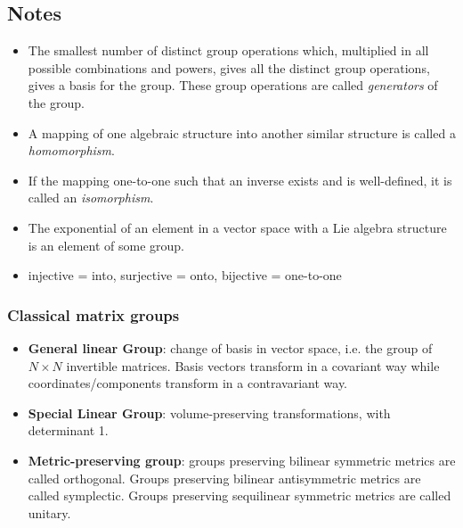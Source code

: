 \subsection{Notes}
\begin{itemize}
    \item The smallest number of distinct group operations which, multiplied in all possible combinations and powers, gives all the distinct group operations, gives a basis for the group. These group operations are called \emph{generators} of the group.
    \item A mapping of one algebraic structure into another similar structure is called a \emph{homomorphism}.
    \item If the mapping one-to-one such that an inverse exists and is well-defined, it is called an \emph{isomorphism}.
    \item The exponential of an element in a vector space with a Lie algebra structure is an element of some group.
    \item injective = into, surjective = onto, bijective = one-to-one
\end{itemize}

\subsubsection*{Classical matrix groups}
\begin{itemize}
    \item \textbf{General linear Group}: change of basis in vector space, i.e. the group of \(N\times N\) invertible matrices. Basis vectors transform in a covariant way while coordinates/components transform in a contravariant way. 
    \item \textbf{Special Linear Group}: volume-preserving transformations, with determinant 1.
    \item \textbf{Metric-preserving group}: groups preserving bilinear symmetric metrics are called orthogonal. Groups preserving bilinear antisymmetric metrics are called symplectic. Groups preserving sequilinear symmetric metrics are called unitary.
\end{itemize}

